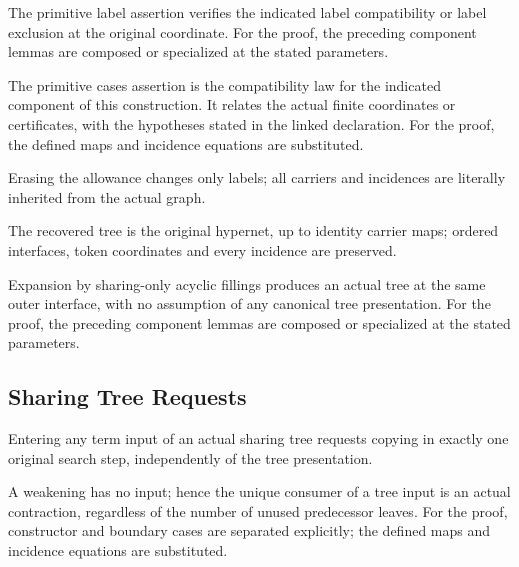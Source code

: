 The primitive label assertion verifies the indicated label compatibility or label exclusion at the original coordinate.
For the proof, the preceding component lemmas are composed or specialized at the stated parameters.
\par{}

The primitive cases assertion is the compatibility law for the indicated component of this construction. It relates the actual finite coordinates or certificates, with the hypotheses stated in the linked declaration.
For the proof, the defined maps and incidence equations are substituted.
\par{}

Erasing the allowance changes only labels; all carriers and incidences are literally inherited from the actual graph.
\par{}

The recovered tree is the original hypernet, up to identity carrier maps; ordered interfaces, token coordinates and every incidence are preserved.
\par{}

Expansion by sharing-only acyclic fillings produces an actual tree at the same outer interface, with no assumption of any canonical tree presentation.
For the proof, the preceding component lemmas are composed or specialized at the stated parameters.
\par{}

\subsection{Sharing Tree Requests}
Entering any term input of an actual sharing tree requests copying in exactly one original search step, independently of the tree presentation.

A weakening has no input; hence the unique consumer of a tree input is an actual contraction, regardless of the number of unused predecessor leaves.
For the proof, constructor and boundary cases are separated explicitly; the defined maps and incidence equations are substituted.
\par{}

